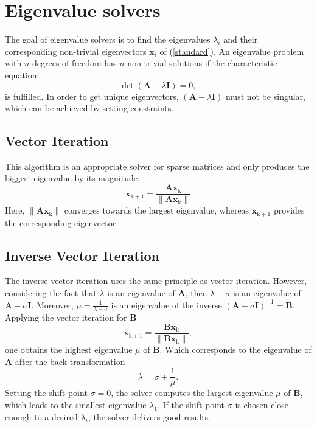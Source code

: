 \documentclass[conference]{journal}
\begin{document}
	
	\section{Eigenvalue solvers}
	The goal of eigenvalue solvers is to find the eigenvalues $\lambda_i$ and their corresponding non-trivial eigenvectors $\textbf{\^x}_i$ of (\ref{standard}). An eigenvalue problem with $n$ degrees of freedom has $n$ non-trivial solutions if the characteristic equation
	\begin{equation}
	\det (\textbf{A}-\lambda\textbf{I})=0,
	\end{equation}
	is fulfilled. In order to get unique eigenvectors, $(\textbf{A}-\lambda\textbf{I})$ must not be singular, which can be achieved by setting constraints. 
	
	\subsection*{Vector Iteration}
	This algorithm is an appropriate solver for sparse matrices and only produces the biggest eigenvalue by its magnitude.  
	\begin{equation}
	\textbf{\^x}_\mathrm{k+1}=\frac{\textbf{A\^x}_\mathrm{k}}{\lVert \textbf{A\^x}_\mathrm{k} \rVert}
	\end{equation}
	Here, $\lVert \textbf{A\^x}_\mathrm{k} \rVert$ converges towards the largest eigenvalue, whereas $\textbf{\^x}_\mathrm{k+1}$ provides the corresponding eigenvector.
	
	\subsection*{Inverse Vector Iteration}
	The inverse vector iteration uses the same principle as vector iteration. However, considering the fact that $\lambda$ is an eigenvalue of $\textbf{A}$, then $\lambda-\sigma$ is an eigenvalue of $\textbf{A}-\sigma\textbf{I}$. Moreover, $\mu=\frac{1}{\lambda - \sigma} $ is an eigenvalue of the inverse $ (\textbf{A}-\sigma \textbf{I})^{-1}= \textbf{B}$. 
	Applying the vector iteration for $\textbf{B}$ 
	\begin{equation}
	\textbf{\^x}_\mathrm{k+1}=\frac{\textbf{B\^x}_\mathrm{k}}{\lVert \textbf{B\^x}_\mathrm{k} \rVert},
	\end{equation}
	one obtains the highest eigenvalue $\mu$ of $\textbf{B}$. Which corresponds to the eigenvalue of $\textbf{A}$ after the back-transformation
	\begin{equation}
	\lambda=\sigma+\frac{1}{\mu}.
	\end{equation}
	Setting the shift point $\sigma=0$, the solver computes the largest eigenvalue $\mu$ of $\textbf{B}$, which leads to the smallest eigenvalue $\lambda_1$. If the shift point $\sigma$ is chosen close enough to a desired $\lambda_i$, the solver delivers good results.
	
\end{document}
